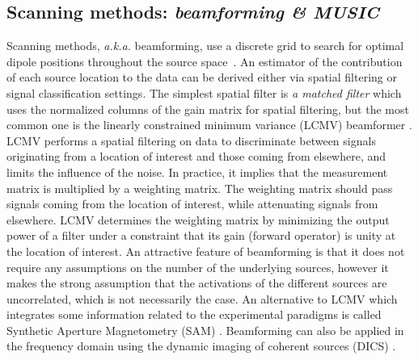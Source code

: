 \subsection{Scanning methods: \textit{beamforming \& MUSIC}}
Scanning methods, \textit{a.k.a.} beamforming, use a discrete grid to search for optimal dipole positions throughout the source space~\cite{hillebrand2005new,mosher99mulsigclassif,scherg1985two}. An estimator of the contribution of each source location to the data can be derived either via spatial filtering or signal classification settings. The simplest spatial filter is \textit{a matched filter} which uses the normalized columns of the gain matrix for spatial filtering, but the most common one is the linearly constrained minimum variance (LCMV) beamformer \cite{van1997localization}.\\
LCMV performs a spatial filtering on data to discriminate between signals originating from a location of interest and those coming from elsewhere, and limits the influence of the noise. In practice, it implies that the measurement matrix is multiplied by a weighting matrix. The weighting matrix should pass signals coming from the location of interest, while attenuating signals from elsewhere. LCMV determines the weighting matrix by minimizing the output power of a filter under a constraint that its gain (forward operator) is unity at the location of interest. An attractive feature of beamforming is that it does not require any assumptions on the number of the underlying sources, however it makes the strong assumption that the activations of the different sources are uncorrelated, which is not necessarily the case. An alternative to LCMV which integrates some information related to the experimental paradigms is called Synthetic Aperture Magnetometry (SAM) \cite{vrba2001signal}. Beamforming can also be applied in the frequency domain using the dynamic imaging of coherent sources (DICS) \cite{gross2001dynamic}.

